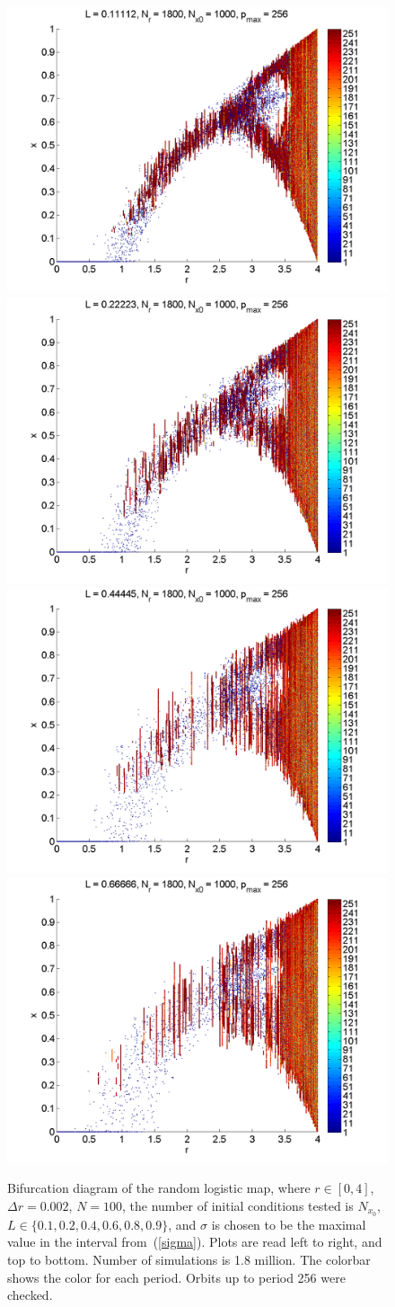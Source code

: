 \begin{figure}[H]\linespread{1}
\caption[Bifurcation diagram of the random logistic map, $\sigma=\sigma_{max}$]{Bifurcation diagram of the random
logistic map, where $r \in [0,4]$, $\Delta r = 0.002$, $N=100$, the
number of initial conditions tested is $N_{x_0}$, $L\in
\{0.1,0.2,0.4,0.6,0.8,0.9\}$, and $\sigma$ is chosen to be the maximal
value in the interval from~(\ref{sigma}). Plots are read left to right, and top to
bottom. Number of simulations is 1.8 million. The colorbar shows the color for each period. Orbits up to period 256 were checked.}\label{fig:rlogbif}
	\begin{center}
		\includegraphics[width=.5\textwidth]{figs/rlog_bif_L_01.png}\hfill
		\includegraphics[width=.5\textwidth]{figs/rlog_bif_L_02.png}\\
		\includegraphics[width=.5\textwidth]{figs/rlog_bif_L_04.png}\hfill
		\includegraphics[width=.5\textwidth]{figs/rlog_bif_L_06.png}\\

\end{center}
\end{figure}
